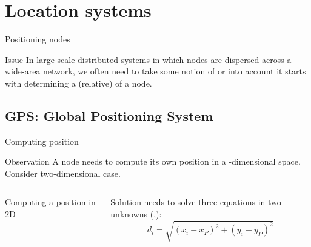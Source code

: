 \section{Location systems}
\begin{slide}{Positioning nodes}
  \begin{block}{Issue}
    In large-scale distributed systems in which nodes are dispersed across a wide-area network, we often need
    to take some notion of  or  into account \mathexpr{\Rightarrow} it starts
    with determining a (relative)  of a node.
  \end{block}
\end{slide}
\subsection{GPS: Global Positioning System}
\begin{slide}{Computing position}
  \begin{block}{Observation} 
    A node  needs   to compute its own position in a
    -dimensional space. Consider two-dimensional case.
  \end{block}
  \begin{columns}[T]
    \begin{column}{0.5\textwidth}
      \begin{block}{Computing a position in 2D}
        \begin{centerfig}
        \end{centerfig}
      \end{block}
    \end{column}
    \begin{column}{0.45\textwidth}
      \begin{block}{Solution} 
         needs to solve three equations in two unknowns (,):
        \[d_i = \sqrt{(x_i - x_P)^2 + (y_i - y_P)^2}\]
      \end{block}
    \end{column}
  \end{columns}
\end{slide}
